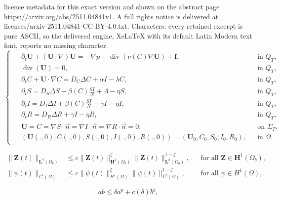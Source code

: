 \documentclass[10pt,a4paper]{amsart}
\begin{document}
licence metadata for this exact version and shown on the abstract page https://arxiv.org/abs/2511.04841v1. A full rights notice is delivered at licenses/arxiv-2511.04841-CC-BY-4.0.txt. Characters: every retained excerpt is pure ASCII, so the delivered engine, XeLaTeX with its default Latin Modern text font, reports no missing character.
	\begin{equation}\label{SIRCNS}
		\begin{cases}
			\begin{split}
				&\partial_t \boldsymbol{U} +(\boldsymbol{U}\cdot\nabla)\boldsymbol{U} = -\nabla p + \operatorname{div}(\nu(C)\nabla\boldsymbol{U} ) + \boldsymbol{f}, &&\text{in } Q_T,\\
				&\operatorname{div}(\boldsymbol{U})=0, &&\text{in } Q_T,\\
				&\partial_t C + \boldsymbol{U}\cdot\nabla C= D_C\Delta C + \alpha I  - \lambda C, &&\text{in } Q_T,\\
				&\partial_t S= D_S\Delta S - \beta(C)\frac{S I}{N}+\Lambda - \eta S, &&\text{in } Q_T,\\
				&\partial_t I= D_I\Delta I + \beta(C)\frac{S I}{N} - \gamma I - \eta I, &&\text{in } Q_T,\\
				&\partial_t R= D_R\Delta R + \gamma I- \eta R, &&\text{in } Q_T,\\
				&\boldsymbol{U}=C=\nabla S \cdot \overrightarrow{n}=\nabla I \cdot \overrightarrow{n}=\nabla R \cdot \overrightarrow{n}=0,  && \text{on } \Sigma_T,\\
				&(\boldsymbol{U}(.,0),C(.,0),S(.,0),I(.,0),R(.,0))=(\boldsymbol{U}_0,C_0,S_0,I_0,R_0) ,  && \text{in }\Omega.
			\end{split}
		\end{cases}
	\end{equation}

	\begin{align}
		\|\boldsymbol{Z}(t)\|_{\mathbf{L}^{4}(\Omega_b)} &\leq c\|\boldsymbol{Z}(t)\|_{\mathbf{H}^{1}(\Omega_b)}^{\zeta}\|\boldsymbol{Z}(t)\|_{\mathbf{L}^{2}(\Omega_b)}^{1-\zeta}, && \text{for all } \boldsymbol{Z} \in \mathbf{H}^{1}(\Omega_b), \label{Gagliardo-Nirenberg-U} \\
		\|\psi(t)\|_{L^{4}(\Omega)} &\leq c\|\psi(t)\|_{H^{1}(\Omega)}^{\zeta}\|\psi(t)\|_{L^{2}(\Omega)}^{1-\zeta}, && \text{for all } \psi \in H^{1}(\Omega) \label{Gagliardo-Nirenberg-C},
	\end{align}

	\begin{equation}\label{inq-Young}
		ab \leq \delta a^{p} + c(\delta) b^{q},
	\end{equation}
\end{document}
